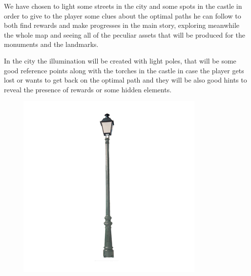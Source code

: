 We have chosen to light some streets in the city and some spots in the castle in order to give to the player some clues about the optimal paths he can follow to both find rewards and make progresses in the main story, exploring meanwhile the whole map and seeing all of the peculiar assets that will be produced for the monuments and the landmarks.

In the city the illumination will be created with light poles, that will be some good reference points along with the torches in the castle in case the player gets lost or wants to get back on the optimal path and they will be also good hints to reveal the presence of rewards or some hidden elements.

\begin{figure}
  \centering
  \includegraphics{Images/Landmarks/lightPole}
  \quad

\end{figure}
